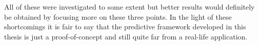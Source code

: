 All of these were investigated to some extent but better results would definitely be obtained by focusing more on these three points. In the light of these shortcomings it is fair to say that the predictive framework developed in this thesis is just a proof-of-concept and still quite far from a real-life application.



